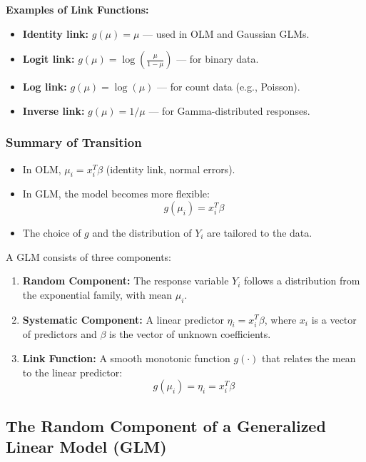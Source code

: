 \documentclass[12pt,a4paper]{article}
\begin{document}
\textbf{Examples of Link Functions:}
\begin{itemize}
  \item \textbf{Identity link:} \( g(\mu) = \mu \) — used in OLM and Gaussian GLMs.
  \item \textbf{Logit link:} \( g(\mu) = \log\left(\frac{\mu}{1 - \mu}\right) \) — for binary data.
  \item \textbf{Log link:} \( g(\mu) = \log(\mu) \) — for count data (e.g., Poisson).
  \item \textbf{Inverse link:} \( g(\mu) = 1/\mu \) — for Gamma-distributed responses.
\end{itemize}



\subsubsection*{Summary of Transition}

\begin{itemize}
  \item In OLM, \( \mu_i = x_i^T \beta \) (identity link, normal errors).
  \item In GLM, the model becomes more flexible:
  \[
  g(\mu_i) = x_i^T \beta
  \]
  \item The choice of \( g \) and the distribution of \( Y_i \) are tailored to the data.
\end{itemize}

A GLM consists of three components:

\begin{enumerate}[label=\arabic*.]
  \item \textbf{Random Component:} The response variable \( Y_i \) follows a distribution from the exponential family, with mean \( \mu_i \).
  
  \item \textbf{Systematic Component:} A linear predictor \( \eta_i = x_i^T \beta \), where \( x_i \) is a vector of predictors and \( \beta \) is the vector of unknown coefficients.

  \item \textbf{Link Function:} A smooth monotonic function \( g(\cdot) \) that relates the mean to the linear predictor: \[ g(\mu_i) = \eta_i = x_i^T \beta \]
\end{enumerate}



\subsection{The Random Component of a Generalized Linear Model (GLM)}
\end{document}
